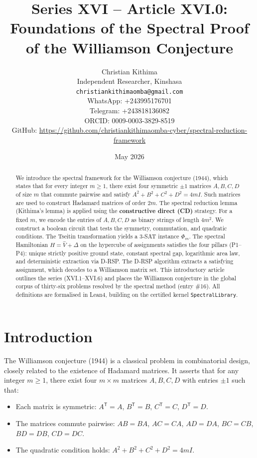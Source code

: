 \documentclass[11pt,a4paper]{article}
\title{Series XVI – Article XVI.0: Foundations of the Spectral Proof of the Williamson Conjecture}
\author{Christian Kithima \\
Independent Researcher, Kinshasa \\
\texttt{christiankithimaomba@gmail.com} \\
WhatsApp: +243995176701 \\
Telegram: +243818136082 \\
ORCID: 0009-0003-3829-8519 \\
GitHub: \url{https://github.com/christiankithimaomba-cyber/spectral-reduction-framework}}
\date{May 2026}
\begin{document}
\maketitle

\begin{abstract}
We introduce the spectral framework for the Williamson conjecture (1944), which states that for every integer $m\ge 1$, there exist four symmetric $\pm1$ matrices $A,B,C,D$ of size $m$ that commute pairwise and satisfy $A^2+B^2+C^2+D^2 = 4m I$. Such matrices are used to construct Hadamard matrices of order $2m$. The spectral reduction lemma (Kithima's lemma) is applied using the \textbf{constructive direct (CD)} strategy. For a fixed $m$, we encode the entries of $A,B,C,D$ as binary strings of length $4m^2$. We construct a boolean circuit that tests the symmetry, commutation, and quadratic conditions. The Tseitin transformation yields a 3‑SAT instance $\Phi_m$. The spectral Hamiltonian $H = \hat{V} + \Delta$ on the hypercube of assignments satisfies the four pillars (P1–P4): unique strictly positive ground state, constant spectral gap, logarithmic area law, and deterministic extraction via D‑RSP. The D‑RSP algorithm extracts a satisfying assignment, which decodes to a Williamson matrix set. This introductory article outlines the series (XVI.1–XVI.6) and places the Williamson conjecture in the global corpus of thirty‑six problems resolved by the spectral method (entry \#16). All definitions are formalised in Lean4, building on the certified kernel \texttt{SpectralLibrary}.
\end{abstract}

\tableofcontents

\section{Introduction}

The Williamson conjecture (1944) is a classical problem in combinatorial design, closely related to the existence of Hadamard matrices. It asserts that for any integer $m\ge 1$, there exist four $m\times m$ matrices $A,B,C,D$ with entries $\pm1$ such that:

\begin{itemize}
\item Each matrix is symmetric: $A^{\mathsf T}=A$, $B^{\mathsf T}=B$, $C^{\mathsf T}=C$, $D^{\mathsf T}=D$.
\item The matrices commute pairwise: $AB=BA$, $AC=CA$, $AD=DA$, $BC=CB$, $BD=DB$, $CD=DC$.
\item The quadratic condition holds: $A^2+B^2+C^2+D^2 = 4m I$.
\end{itemize}
\end{document}
